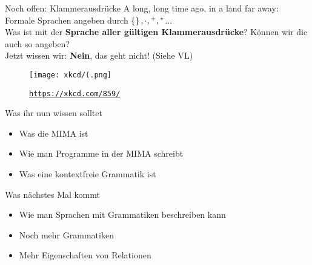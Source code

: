 

\begin{frame}{Noch offen: Klammerausdrücke}
	A long, long time ago, in a land far away:\\
	\medskip
	Formale Sprachen angeben durch $\left\{\right\}, \cdot, {}^+, {}^*$...\\
	Was ist mit der \textbf{Sprache aller gültigen Klammerausdrücke}? Können wir die auch so angeben?\\[1em]
	\pause
	\impl Jetzt wissen wir: \textbf{Nein}, das geht nicht! (Siehe VL)\\[1em]
	
	\begin{figure}[H]
		\centering
		\texttt{[image: xkcd/(.png]}
		\vspace{-7pt}
		\caption{ \texttt{\url{https://xkcd.com/859/}} }
	\end{figure}
\end{frame}



%

\begin{frame}	
	\begin{block}{Was ihr nun wissen solltet}
		\begin{itemize}
			\item Was die MIMA ist
			\item Wie man Programme in der MIMA schreibt
			\item Was eine kontextfreie Grammatik ist
		\end{itemize}
	\end{block}
	
	\begin{block}{Was nächstes Mal kommt}
		\begin{itemize}
			\item Wie man Sprachen mit Grammatiken beschreiben kann
			\item Noch mehr Grammatiken
			\item Mehr Eigenschaften von Relationen
		\end{itemize}
	\end{block}
\end{frame}	


\slideThanks

